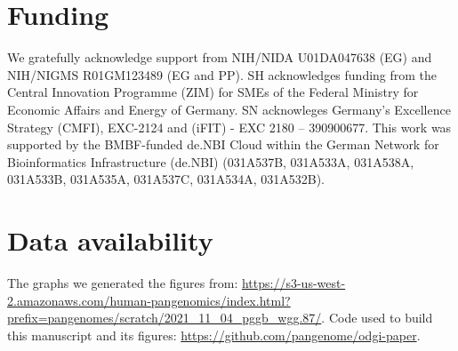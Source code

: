\documentclass{bioinfo}
\begin{document}



\section*{Funding}

We gratefully acknowledge support from NIH/NIDA U01DA047638 (EG) and NIH/NIGMS R01GM123489 (EG and PP).
SH acknowledges funding from the Central Innovation Programme (ZIM) for SMEs of the Federal Ministry for Economic Affairs and Energy of Germany. SN acknowleges Germany’s Excellence Strategy (CMFI), EXC-2124 and (iFIT) - EXC 2180 – 390900677.
This work was supported by the BMBF-funded de.NBI Cloud within the German Network for Bioinformatics Infrastructure (de.NBI) (031A537B, 031A533A, 031A538A, 031A533B, 031A535A, 031A537C, 031A534A, 031A532B).


\section*{Data availability}

The graphs we generated the figures from: \url{https://s3-us-west-2.amazonaws.com/human-pangenomics/index.html?prefix=pangenomes/scratch/2021_11_04_pggb_wgg.87/}.
Code used to build this manuscript and its figures: \url{https://github.com/pangenome/odgi-paper}.



%
%
%
%
%
%
%






\end{document}

